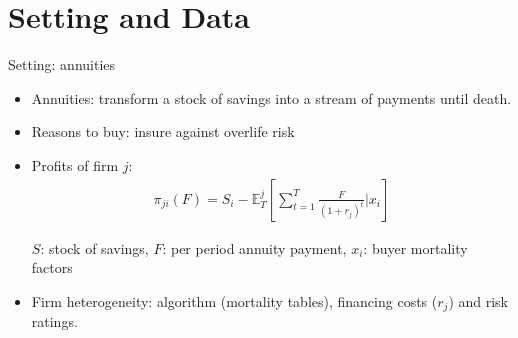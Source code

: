 \documentclass[10pt,aspectratio=169]{beamer}
\begin{document}

\section{Setting and Data}

\begin{frame}{Setting: annuities}\label{slide:setting}
    
    \begin{itemize}%
    \item Annuities: transform a stock of savings into a stream of payments until death.
    \item Reasons to buy: insure against overlife risk
        \item Profits of firm $j$: 
    \begin{align*}
    \pi_{ji}(F) = S_i-  \mathbb{E}^j_{T} \left[\sum_{t=1}^T\frac{F}{(1+r_j)^t}|x_i \right]
    \end{align*}
   
     $S$: stock of savings, $F$: per period annuity payment, $x_i$: buyer mortality factors
    
    \item Firm heterogeneity: algorithm (mortality tables), financing costs ($r_j$) and risk ratings. 
    
    \end{itemize}


\end{frame}
\end{document}
